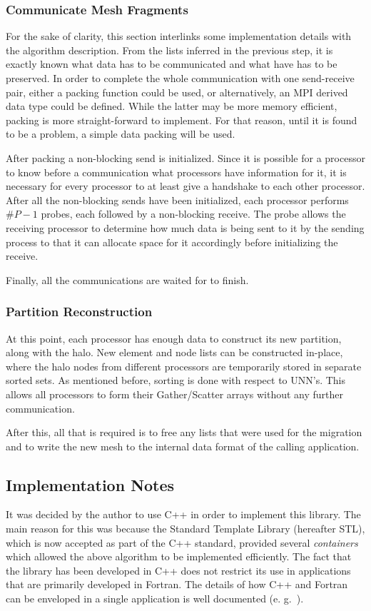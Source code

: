 \documentclass[11pt]{article}
\begin{document}
\subsubsection{Communicate Mesh Fragments}
For the sake of clarity, this section interlinks some implementation
details with the algorithm description. From the lists inferred in the
previous step, it is exactly known what data has to be communicated
and what have has to be preserved. In order to complete the whole
communication with one send-receive pair, either a packing function
could be used, or alternatively, an MPI derived data type could be
defined. While the latter may be more memory efficient, packing is
more straight-forward to implement. For that reason, until it is found
to be a problem, a simple data packing will be used.

After packing a non-blocking send is initialized. Since it is possible
for a processor to know before a communication what processors have
information for it, it is necessary for every processor to at least
give a handshake to each other processor. After all the non-blocking
sends have been initialized, each processor performs $\#P-1$ probes,
each followed by a non-blocking receive. The probe allows the
receiving processor to determine how much data is being sent to it by
the sending process to that it can allocate space for it accordingly
before initializing the receive.

Finally, all the communications are waited for to finish.

\subsubsection{Partition Reconstruction}
At this point, each processor has enough data to construct its new
partition, along with the halo. New element and node lists can be
constructed in-place, where the halo nodes from different processors
are temporarily stored in separate sorted sets. As mentioned before,
sorting is done with respect to UNN's. This allows all processors to
form their Gather/Scatter arrays without any further communication.

After this, all that is required is to free any lists that were used
for the migration and to write the new mesh to the internal data
format of the calling application.

\subsection{Implementation Notes}
It was decided by the author to use C++ in order to implement this
library. The main reason for this was because the Standard Template
Library (hereafter STL), which is now accepted as part of the C++
standard, provided several {\it containers} which allowed the above
algorithm to be implemented efficiently. The fact that the library has
been developed in C++ does not restrict its use in applications that
are primarily developed in Fortran. The details of how C++ and
Fortran can be enveloped in a single application is well documented
(e. g.~\cite{gorman_mixed_langs}).
\end{document}
